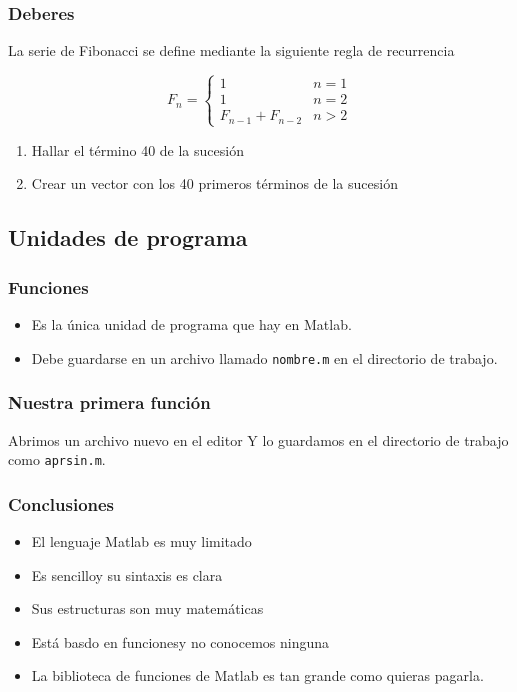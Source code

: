 \documentclass[12pt]{beamer}
\begin{document}
\begin{frame}
  \frametitle{Deberes}
  La serie de Fibonacci se define mediante la siguiente regla de
  recurrencia

  \[
  F_{n}=\left\{ \begin{array}{cc}
      1 & n=1\\
      1 & n=2\\
      F_{n-1}+F_{n-2} & n>2\end{array}\right.\]
  
  \begin{enumerate}
  \item Hallar el término 40 de la sucesión
  \item Crear un vector con los 40 primeros términos de la sucesión
  \end{enumerate}
\end{frame}

\subsection{Unidades de programa}

\begin{frame}
  \frametitle{Funciones}
  \begin{itemize}
  \item Es la única unidad de programa que hay en Matlab.
  \item Debe guardarse en un archivo llamado \texttt{nombre.m} en el
    directorio de trabajo.
  \end{itemize}

  \testcode
\end{frame}

\begin{frame}
  \frametitle{Nuestra primera función}
Abrimos un archivo nuevo en el editor
\testcode
Y lo guardamos en el directorio de trabajo como \texttt{aprsin.m}.
\end{frame}


\begin{frame}
\frametitle{Conclusiones}
\begin{itemize}
\item El lenguaje Matlab es muy limitado
\item Es sencilloy su sintaxis es clara
\item Sus estructuras son muy matemáticas
\item Está basdo en funcionesy no conocemos ninguna
\item La biblioteca de funciones de Matlab es tan grande como quieras
  pagarla.
\end{itemize}
\end{frame}
\end{document}

